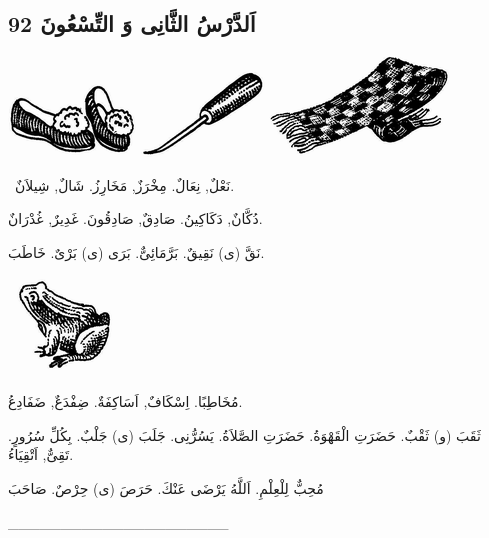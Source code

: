 \documentclass[a5paper]{article}
\begin{document}
\subsection{اَلدَّرْسُ الثَّانِى وَ التِّسْعُونَ 92}
 \includegraphics[width=1.3335in,height=0.7602in]{images/MuhammadBagauddinprettified-img255.png}   \includegraphics[width=1.2917in,height=0.9165in]{images/MuhammadBagauddinprettified-img256.png}   \includegraphics[width=1.8854in,height=1.052in]{images/MuhammadBagauddinprettified-img257.png} 

\ نَعْلٌ, نِعَالٌ. مِخْرَزٌ, مَخَارِزُ. شَالٌ, شِيلاَنٌ. 

دُكَّانٌ, دَكَاكِينُ. صَادِقٌ, صَادِقُونَ. غَدِيرٌ, غُدْرَانٌ. 

نَقَّ (ى) نَقِيقٌ. بَرَّمَائِىٌّ. بَرَى (ى) بَرْىٌ. خَاطَبَ. 

\  \includegraphics[width=1.052in,height=1.0102in]{images/MuhammadBagauddinprettified-img258.png} 

مُخَاطِبًا. اِسْكَافٌ, اَسَاكِفَةٌ. ضِفْدَعٌ, ضَفَادِعُ. 

ثَقَبَ (و) ثَقْبٌ. حَضَرَتِ الْقَهْوَةُ. حَضَرَتِ الصَّلاَةُ. يَسُرُّنِى. جَلَبَ (ى) جَلْبٌ. بِكُلِّ سُرُورٍ. تَقِىٌّ, اَتْقِيَاءُ.

مُحِبٌّ لِلْعِلْمِ. اَللَّهُ يَرْضَى عَنْكَ. حَرَصَ (ى) حِرْصٌ. صَاحَبَ

\_\_\_\_\_\_\_\_\_\_\_\_\_\_\_\_\_\_\_\_\_
\end{document}
